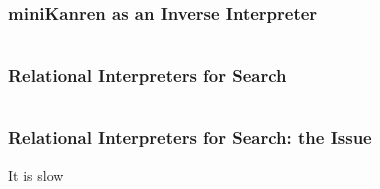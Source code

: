 \documentclass[xcolor=table, aspectratio=169]{beamer}
\begin{document}
\begin{frame}[fragile]
  \frametitle{miniKanren as an Inverse Interpreter}
  \begin{columns}[t]
    \begin{column}{0.49\textwidth}
      
   \end{column}
  \end{columns}
\end{frame}

\begin{frame}[fragile]
  \frametitle{Relational Interpreters for Search}

\begin{columns}
  \begin{column}{0.49\textwidth}
    
  \end{column}

  \begin{column}{0.49\textwidth}
    
  \end{column}
\end{columns}

 
\end{frame}

\begin{frame}[fragile]
  \frametitle{Relational Interpreters for Search: the Issue}
\begin{center}
  It is slow
\end{center}

\vspace{0.5cm}

\end{frame}
\end{document}
